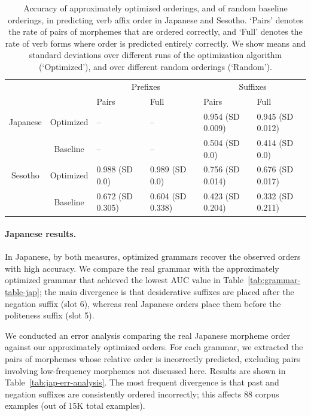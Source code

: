 \begin{table}
\begin{tabular}{cc||ll|ll}
             &              & \multicolumn{2}{c}{Prefixes}    & \multicolumn{2}{|c}{Suffixes} \\
             &              & Pairs & Full & Pairs & Full \\ \hline\hline
Japanese & Optimized  & -- &  -- &   0.954 (SD 0.009) & 0.945 (SD 0.012) \\ 
& Baseline    & -- & -- & 0.504 (SD 0.0) & 0.414 (SD 0.0) \\ \hline
Sesotho &   Optimized  &  0.988 (SD 0.0) & 0.989 (SD 0.0) & 0.756 (SD 0.014) & 0.676 (SD 0.017) \\
&   Baseline  &  0.672 (SD 0.305) & 0.604 (SD 0.338) & 0.423 (SD 0.204) & 0.332 (SD 0.211) \\ 
\end{tabular}
\caption{Accuracy of approximately optimized orderings, and of random baseline orderings, in predicting verb affix order in Japanese and Sesotho. `Pairs' denotes the rate of pairs of morphemes that are ordered correctly, and `Full' denotes the rate of verb forms where order is predicted entirely correctly. We show means and standard deviations over different runs of the optimization algorithm (`Optimized'), and over different random orderings (`Random').}\label{tab:morph-acc}
\end{table}

\paragraph{Japanese results.} In Japanese, by both measures, optimized grammars recover the observed orders with high accuracy.
We compare the real grammar with the approximately optimized grammar that achieved the lowest AUC value in Table~\ref{tab:grammar-table-jap}; the main divergence is that desiderative suffixes are placed after the negation suffix (slot 6), whereas real Japanese orders place them before the politeness suffix (slot 5).

We conducted an error analysis comparing the real Japanese morpheme order against our approximately optimized orders.
For each grammar, we extracted the pairs of morphemes whose relative order is incorrectly predicted, excluding pairs involving low-frequency morphemes not discussed here. %
Results are shown in Table~\ref{tab:jap-err-analysis}.
The most frequent divergence is that past and negation suffixes are consistently ordered incorrectly; this affects 88 corpus examples (out of 15K total examples).

